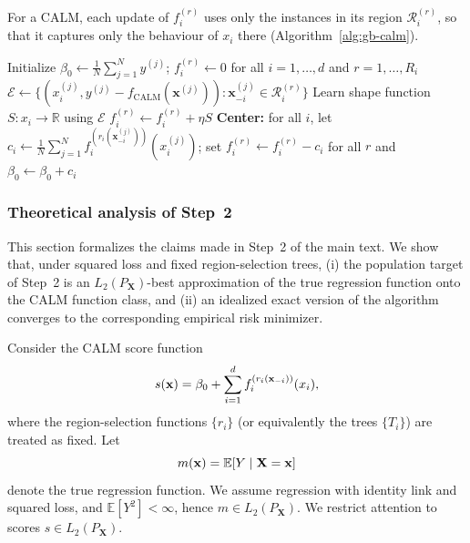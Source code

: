 For a CALM, each update of \(f_i^{(r)}\) uses only the instances in its region \(\mathcal{R}_i^{(r)}\), so that it captures only the behaviour of \(x_i\) there (Algorithm~\ref{alg:gb-calm}).

\begin{algorithm}[tb]
\caption{Gradient Boosting for CALM}
\label{alg:gb-calm}
\begin{algorithmic}[1]
   \STATE Initialize $\beta_0 \leftarrow \frac{1}{N}\sum_{j=1}^N y^{(j)}$; $f_i^{(r)} \leftarrow 0$ for all $i = 1, \dots, d$ and $r = 1, \dots, R_i$
            \STATE $\mathcal{E} \leftarrow \{(x^{(j)}_i, y^{(j)} - f_{\text{CALM}}(\mathbf{x}^{(j)})) : \mathbf{x}^{(j)}_{-i} \in \mathcal{R}_i^{(r)}\}$
            \STATE Learn shape function $S : x_i \rightarrow \mathbb{R}$ using $\mathcal{E}$
            \STATE $f_i^{(r)} \leftarrow f_i^{(r)} + \eta S$ 
         \ENDFOR
      \ENDFOR
      \STATE \textbf{Center:} for all $i$, let $c_i \leftarrow \frac{1}{N}\sum_{j=1}^N f_i^{(r_i(\mathbf{x}^{(j)}_{-i}))}(x_i^{(j)})$; set $f_i^{(r)} \leftarrow f_i^{(r)} - c_i$ for all $r$ and $\beta_0 \leftarrow \beta_0 + c_i$ 
   \ENDFOR
\end{algorithmic}
\end{algorithm}

\subsubsection{Theoretical analysis of Step~2}
\label{app:step3-theory}

This section formalizes the claims made in Step~2 of the main text.
We show that, under squared loss and fixed region-selection trees, (i) the
population target of Step~2 is an $L_2(P_{\mathbf{X}})$-best approximation of the true regression
function onto the CALM function class, and (ii) an idealized exact version of the
algorithm converges to the corresponding empirical risk minimizer.

Consider the CALM score function
\begin{equation}
s(\mathbf{x})
=
\beta_0
+
\sum_{i=1}^d f_i^{(r_i(\mathbf{x}_{-i}))}(x_i),
\label{eq:calm-score}
\end{equation}
where the region-selection functions $\{r_i\}$ (or equivalently the trees
$\{T_i\}$) are treated as fixed.
Let
\[
m(\mathbf{x})=\mathbb{E}[Y\mid \mathbf{X}=\mathbf{x}]
\]
denote the true regression function.
We assume regression with identity link and squared loss, and $\mathbb{E}[Y^2]<\infty$, hence $m\in L_2(P_{\mathbf{X}})$.
We restrict attention to scores $s\in L_2(P_{\mathbf{X}})$.

